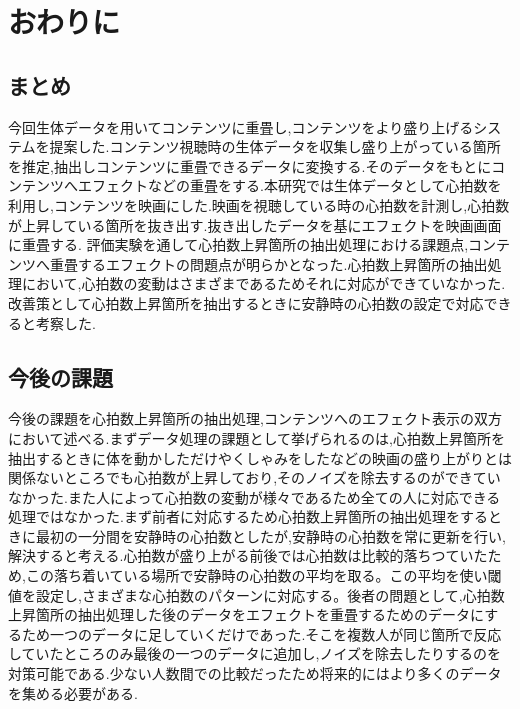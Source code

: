 \chapter{おわりに}

\section{まとめ}
今回生体データを用いてコンテンツに重畳し,コンテンツをより盛り上げるシステムを提案した.コンテンツ視聴時の生体データを収集し盛り上がっている箇所を推定,抽出しコンテンツに重畳できるデータに変換する.そのデータをもとにコンテンツへエフェクトなどの重畳をする.本研究では生体データとして心拍数を利用し,コンテンツを映画にした.映画を視聴している時の心拍数を計測し,心拍数が上昇している箇所を抜き出す.抜き出したデータを基にエフェクトを映画画面に重畳する.
評価実験を通して心拍数上昇箇所の抽出処理における課題点,コンテンツへ重畳するエフェクトの問題点が明らかとなった.心拍数上昇箇所の抽出処理において,心拍数の変動はさまざまであるためそれに対応ができていなかった.改善策として心拍数上昇箇所を抽出するときに安静時の心拍数の設定で対応できると考察した.

\section{今後の課題}
今後の課題を心拍数上昇箇所の抽出処理,コンテンツへのエフェクト表示の双方において述べる.まずデータ処理の課題として挙げられるのは,心拍数上昇箇所を抽出するときに体を動かしただけやくしゃみをしたなどの映画の盛り上がりとは関係ないところでも心拍数が上昇しており,そのノイズを除去するのができていなかった.また人によって心拍数の変動が様々であるため全ての人に対応できる処理ではなかった.まず前者に対応するため心拍数上昇箇所の抽出処理をするときに最初の一分間を安静時の心拍数としたが,安静時の心拍数を常に更新を行い,解決すると考える.心拍数が盛り上がる前後では心拍数は比較的落ちつていたため,この落ち着いている場所で安静時の心拍数の平均を取る。この平均を使い閾値を設定し,さまざまな心拍数のパターンに対応する。後者の問題として,心拍数上昇箇所の抽出処理した後のデータをエフェクトを重畳するためのデータにするため一つのデータに足していくだけであった.そこを複数人が同じ箇所で反応していたところのみ最後の一つのデータに追加し,ノイズを除去したりするのを対策可能である.少ない人数間での比較だったため将来的にはより多くのデータを集める必要がある.